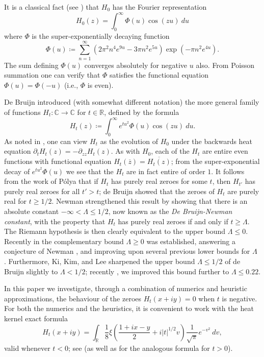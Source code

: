\documentclass[a4paper,11pt,twoside]{amsart}
\newcommand\R{\mathbb{R}}
\newcommand\C{\mathbb{C}}
\begin{document}
It is a classical fact (see \cite[p. 255]{titch}) that $H_0$ has the Fourier representation
$$ H_0(z) = \int_0^\infty \Phi(u) \cos(zu)\ du$$
where $\Phi$ is the super-exponentially decaying function
\begin{equation}\label{phidef}
 \Phi(u) \coloneqq \sum_{n=1}^\infty (2\pi^2  n^4 e^{9u} - 3\pi n^2 e^{5u} ) \exp(-\pi n^2 e^{4u} ).
\end{equation}
The sum defining $\Phi(u)$ converges absolutely for negative $u$ also.  From Poisson summation one can verify that $\Phi$ satisfies the functional equation $\Phi(u) = \Phi(-u)$ (i.e., $\Phi$ is even). 

De Bruijn \cite{debr} introduced (with somewhat different notation) the more general family of functions $H_t \colon \C \to \C$ for $t \in \R$, defined by the formula
\begin{equation}\label{htdef}
 H_t(z) \coloneqq \int_0^\infty e^{tu^2} \Phi(u) \cos(zu)\ du.
\end{equation}
As noted in \cite[p.114]{csv}, one can view $H_t$ as the evolution of $H_0$ under the backwards heat equation $\partial_t H_t(z)= -\partial_{zz} H_t(z)$.
As with $H_0$, each of the $H_t$ are entire even functions with functional equation $H_t(\overline{z}) = \overline{H_t(z)}$; from the super-exponential decay of $e^{tu^2} \Phi(u)$ we see that the $H_t$ are in fact entire of order $1$.  It follows from the work of P\'olya \cite{polya} that if $H_t$ has purely real zeroes for some $t$, then $H_{t'}$ has purely real zeroes for all $t'>t$; de Bruijn showed that the zeroes of $H_t$ are purely real for $t \geq 1/2$.  Newman \cite{newman} strengthened this result by showing that there is an absolute constant $-\infty < \Lambda \leq 1/2$, now known as the \emph{De Bruijn-Newman constant}, with the property that $H_t$ has purely real zeroes if and only if $t \geq \Lambda$.  The Riemann hypothesis is then clearly equivalent to the upper bound $\Lambda \leq 0$.  Recently in \cite{brad} the complementary bound $\Lambda \geq 0$ was established, answering a conjecture of Newman \cite{newman}, and improving upon several previous lower bounds for $\Lambda$ \cite{cnv,nrv,crv,cosv,odlyzko,saouter}.  Furthermore, Ki, Kim, and Lee \cite{kkl} sharpened the upper bound $\Lambda \leq 1/2$ of de Bruijn \cite{debr} slightly to $\Lambda < 1/2$; recently \cite{polymath15}, we improved this bound further to $\Lambda \leq 0.22$.

In this paper we investigate, through a combination of numerics and heuristic approximations, the behaviour of the zeroes $H_t(x+iy)=0$ when $t$ is negative. For both the numerics and the heuristics, it is convenient to work with the heat kernel exact formula
\begin{equation}\label{11}
H_t(x+iy) = \int_{\R} \frac{1}{8} \xi(\frac{1+ix-y}{2} + i |t|^{1/2} v) \frac{1}{\sqrt{\pi}} e^{-v^2}\ dv,
\end{equation}
valid whenever $t<0$; see \cite[(15)]{brad} (as well as \cite[(35)]{polymath15} for the analogous formula for $t>0$).
\end{document}
